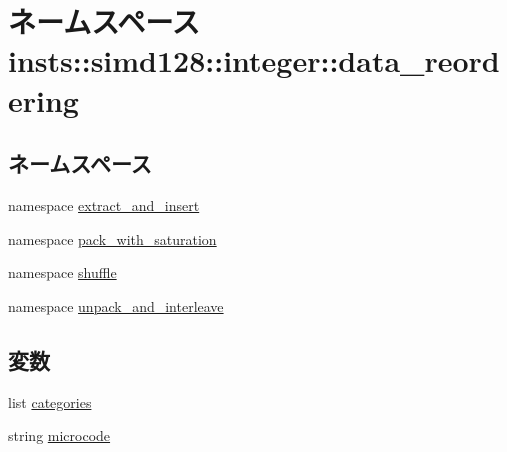 \hypertarget{namespaceinsts_1_1simd128_1_1integer_1_1data__reordering}{
\section{ネームスペース insts::simd128::integer::data\_\-reordering}
\label{namespaceinsts_1_1simd128_1_1integer_1_1data__reordering}
}
\subsection*{ネームスペース}
\begin{DoxyCompactItemize}
\item 
namespace \hyperlink{namespaceinsts_1_1simd128_1_1integer_1_1data__reordering_1_1extract__and__insert}{extract\_\-and\_\-insert}
\item 
namespace \hyperlink{namespaceinsts_1_1simd128_1_1integer_1_1data__reordering_1_1pack__with__saturation}{pack\_\-with\_\-saturation}
\item 
namespace \hyperlink{namespaceinsts_1_1simd128_1_1integer_1_1data__reordering_1_1shuffle}{shuffle}
\item 
namespace \hyperlink{namespaceinsts_1_1simd128_1_1integer_1_1data__reordering_1_1unpack__and__interleave}{unpack\_\-and\_\-interleave}
\end{DoxyCompactItemize}
\subsection*{変数}
\begin{DoxyCompactItemize}
\item 
list \hyperlink{namespaceinsts_1_1simd128_1_1integer_1_1data__reordering_a273cf0f1630af14c1582f05e53354a55}{categories}
\item 
string \hyperlink{namespaceinsts_1_1simd128_1_1integer_1_1data__reordering_a770f11a173e99389a8802f0107ed8f52}{microcode}
\end{DoxyCompactItemize}


